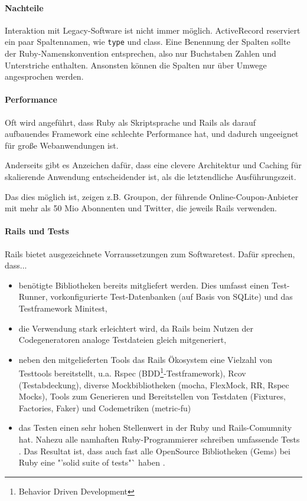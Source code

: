 
\paragraph{Nachteile}
Interaktion mit Legacy-Software ist nicht immer möglich. ActiveRecord reserviert ein paar Spaltennamen, wie \texttt{type} und  class. Eine Benennung der Spalten sollte der Ruby-Namenskonvention entsprechen, also nur Buchstaben Zahlen und Unterstriche enthalten. Ansonsten können die Spalten nur über Umwege angesprochen werden.

\paragraph{Performance} Oft wird angeführt, dass Ruby als Skriptsprache und Rails als darauf aufbauendes Framework eine schlechte Performance hat, und dadurch ungeeignet für große Webanwendungen ist.


Anderseits gibt es Anzeichen dafür, dass eine clevere Architektur und Caching für skalierende Anwendung entscheidender ist, als die letztendliche Ausführungszeit.

Das dies möglich ist, zeigen z.B. Groupon, der führende Online-Coupon-Anbieter mit mehr als 50 Mio Abonnenten und 
Twitter, die jeweils Rails verwenden.

\paragraph{Rails und Tests}
Rails bietet ausgezeichnete Vorraussetzungen zum Softwaretest. Dafür sprechen, dass...

\begin{itemize}
 \item benötigte Bibliotheken bereits mitgliefert werden. Dies umfasst einen Test-Runner, vorkonfigurierte Test-Datenbanken (auf Basis von SQLite) und das Testframework Minitest,
 \item die Verwendung stark erleichtert wird, da Rails beim Nutzen der Codegeneratoren analoge Testdateien gleich mitgeneriert,
 \item neben den mitgelieferten Tools das Rails Ökosystem eine Vielzahl von Testtools bereitstellt, u.a. Rspec (BDD\footnote{Behavior Driven Development}-Testframework), Rcov (Testabdeckung), diverse Mockbibliotheken (mocha, FlexMock, RR, Rspec Mocks), Tools zum Generieren und Bereitstellen von Testdaten (Fixtures, Factories, Faker) und Codemetriken (metric-fu)
 \item das Testen einen sehr hohen Stellenwert in der Ruby und Rails-Comumnity hat. Nahezu alle namhaften Ruby-Programmierer schreiben umfassende Tests \citep{devries_rails_2008}. Das Resultat ist, dass auch fast alle OpenSource Bibliotheken (Gems) bei Ruby eine "'solid suite of tests"` haben \citep{devries_rails_2008}. 
\end{itemize}

